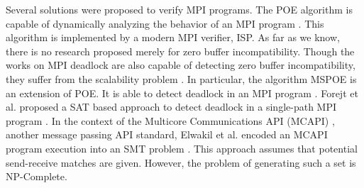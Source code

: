 Several solutions were proposed to verify MPI programs. The POE algorithm is capable of dynamically analyzing the behavior of an MPI program \cite{DBLP:conf/ppopp/VakkalankaSGK08}. This algorithm is implemented by a modern MPI verifier, ISP. As far as we know, there is no research proposed merely for zero buffer incompatibility. Though the works on MPI deadlock are also capable of detecting zero buffer incompatibility, they suffer from the scalability problem \cite{DBLP:conf/sbmf/SharmaGB12,DBLP:conf/fm/ForejtKNS14}. In particular, the algorithm MSPOE is an extension of POE. It is able to detect deadlock in an MPI program \cite{DBLP:conf/sbmf/SharmaGB12}. %
Forejt et al. proposed a SAT based approach to detect deadlock in a single-path MPI program \cite{DBLP:conf/fm/ForejtKNS14}. 
In the context of the Multicore Communications API (MCAPI) \cite{mcapi}, another message passing API standard, Elwakil et al. encoded an MCAPI program execution into an SMT problem \cite{DBLP:conf/issta/ElwakilY10,DBLP:conf/atva/ElwakilYW10}. This approach assumes that potential send-receive matches are given. However, the problem of generating such a set is NP-Complete.








